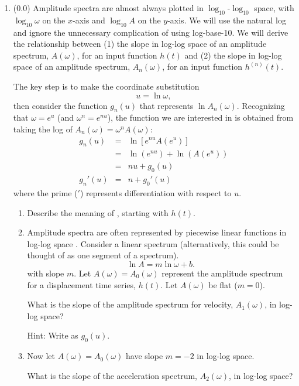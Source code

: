 \documentclass[11pt,titlepage,fleqn]{article}
\newcommand{\fft}{h}
\begin{document}
\begin{enumerate}
\item (0.0) Amplitude spectra are almost always plotted in $\log_{10}$-$\log_{10}$ space, with $\log_{10}\omega$ on the $x$-axis and $\log_{10}A$ on the $y$-axis. We will use the natural log and ignore the unnecessary complication of using log-base-10. We will derive the relationship between (1) the slope in log-log space of an amplitude spectrum, $A(\omega)$, for an input function $\fft(t)$ and (2)  the slope in log-log space of an amplitude spectrum, $A_n(\omega)$, for an input function $h^{(n)}(t)$.

The key step is to make the coordinate substitution
%
\begin{equation}
u = \ln\omega,
\end{equation}
%
then consider the function $g_n(u)$ that represents $\ln A_n(\omega)$. Recognizing that $\omega = e^u$ (and $\omega^n = e^{nu}$), the function we are interested in is obtained from taking the log of \mbox{$A_n(\omega) = \omega^n A(\omega)$}:
%
\begin{eqnarray}
g_n(u) &=& \ln[ e^{nu} A(e^u) ]
\\
&=& \ln(e^{nu}) + \ln(A(e^u))
\\
&=& nu + g_0(u)
\\
g_n'(u) &=& n + g_0'(u)
\label{Anslope}
\end{eqnarray}
%
where the prime ($'$) represents differentiation with respect to $u$.

\begin{enumerate}
\item Describe the meaning of , starting with $\fft(t)$.

\item Amplitude spectra are often represented by piecewise linear functions in log-log space \citep[\eg][Figs.~6.3-6 and 6.6-8]{SteinWysession}. Consider a linear spectrum (alternatively, this could be thought of as one segment of a spectrum).
%
\begin{equation}
\ln A = m \ln\omega + b.
\label{Alin}
\end{equation}
%
with slope $m$.
Let $A(\omega) = A_0(\omega)$ represent the amplitude spectrum for a displacement time series, $\fft(t)$. Let $A(\omega)$ be flat ($m=0$).

What is the slope of the amplitude spectrum for velocity, $A_1(\omega)$, in log-log space?

Hint: Write  as $g_0(u)$.

\item Now let $A(\omega) = A_0(\omega)$ have slope $m=-2$ in log-log space.

What is the slope of the acceleration spectrum, $A_2(\omega)$, in log-log space?

\end{enumerate}

\end{enumerate}
\end{document}
